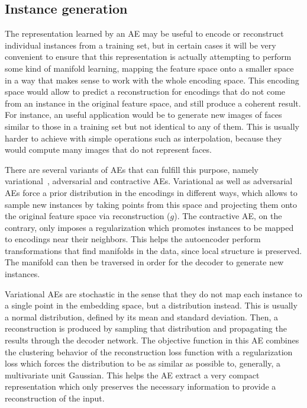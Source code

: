 \subsection{Instance generation}

The representation learned by an AE may be useful to encode or reconstruct individual instances from a training set, but in certain cases it will be very convenient to ensure that this representation is actually attempting to perform some kind of manifold learning, mapping the feature space onto a smaller space in a way that makes sense to work with the whole encoding space. This encoding space would allow to predict a reconstruction for encodings that do not come from an instance in the original feature space, and still produce a coherent result. For instance, an useful application would be to generate new images of faces similar to those in a training set but not identical to any of them. This is usually harder to achieve with simple operations such as interpolation, because they would compute many images that do not represent faces.

There are several variants of AEs that can fulfill this purpose, namely variational~\cite{variational}, adversarial and contractive AEs. Variational as well as adversarial AEs force a prior distribution in the encodings in different ways, which allows to sample new instances by taking points from this space and projecting them onto the original feature space via reconstruction ($g$). The contractive AE, on the contrary, only imposes a regularization which promotes instances to be mapped to encodings near their neighbors. This helps the autoencoder perform transformations that find manifolds in the data, since local structure is preserved. The manifold can then be traversed in order for the decoder to generate new instances.

Variational AEs are stochastic in the sense that they do not map each instance to a single point in the embedding space, but a distribution instead. This is usually a normal distribution, defined by its mean and standard deviation. Then, a reconstruction is produced by sampling that distribution and propagating the results through the decoder network. The objective function in this AE combines the clustering behavior of the reconstruction loss function with a regularization loss which forces the distribution to be as similar as possible to, generally, a multivariate unit Gaussian. This helps the AE extract a very compact representation which only preserves the necessary information to provide a reconstruction of the input.

